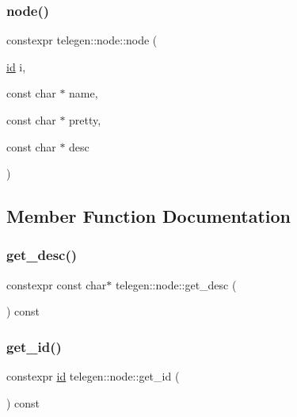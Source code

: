 \subsubsection{\texorpdfstring{node()}{node()}}
{\footnotesize\ttfamily constexpr telegen\+::node\+::node (\begin{DoxyParamCaption}\item[{\hyperlink{classtelegen_1_1node_aae3ff0d12932c55fdc88a1743e27ea56}{id}}]{i,  }\item[{const char $\ast$}]{name,  }\item[{const char $\ast$}]{pretty,  }\item[{const char $\ast$}]{desc }\end{DoxyParamCaption})\hspace{0.3cm}{\ttfamily [inline]}}



\subsection{Member Function Documentation}
\mbox{\label{classtelegen_1_1node_a9393b332196fe1a8458d85308f8551d5}} 
\subsubsection{\texorpdfstring{get\+\_\+desc()}{get\_desc()}}
{\footnotesize\ttfamily constexpr const char$\ast$ telegen\+::node\+::get\+\_\+desc (\begin{DoxyParamCaption}{ }\end{DoxyParamCaption}) const\hspace{0.3cm}{\ttfamily [inline]}}

\mbox{\label{classtelegen_1_1node_a9e94c3554697bb443e67316170815eed}} 
\subsubsection{\texorpdfstring{get\+\_\+id()}{get\_id()}}
{\footnotesize\ttfamily constexpr \hyperlink{classtelegen_1_1node_aae3ff0d12932c55fdc88a1743e27ea56}{id} telegen\+::node\+::get\+\_\+id (\begin{DoxyParamCaption}{ }\end{DoxyParamCaption}) const\hspace{0.3cm}{\ttfamily [inline]}}

